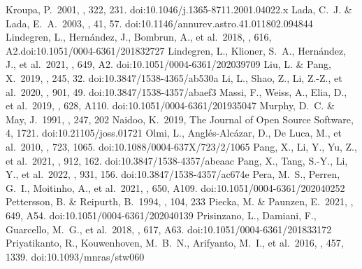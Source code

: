 \documentclass{aa} %
\begin{document}
\begin{thebibliography}{}
     Kroupa, P.\ 2001, \mnras, 322, 231. doi:10.1046/j.1365-8711.2001.04022.x
     Lada, C.~J. \& Lada, E.~A.\ 2003, \araa, 41, 57. doi:10.1146/annurev.astro.41.011802.094844
     Lindegren, L., Hern{\'a}ndez, J., Bombrun, A., et al.\ 2018, \aap, 616, A2.doi:10.1051/0004-6361/201832727
     Lindegren, L., Klioner, S.~A., Hern{\'a}ndez, J., et al.\ 2021, \aap, 649, A2. doi:10.1051/0004-6361/202039709
     Liu, L. \& Pang, X.\ 2019, \apjs, 245, 32. doi:10.3847/1538-4365/ab530a
     Li, L., Shao, Z., Li, Z.-Z., et al.\ 2020, \apj, 901, 49. doi:10.3847/1538-4357/abaef3
     Massi, F., Weiss, A., Elia, D., et al.\ 2019, \aap, 628, A110. doi:10.1051/0004-6361/201935047
     Murphy, D.~C. \& May, J.\ 1991, \aap, 247, 202        
     Naidoo, K.\ 2019, The Journal of Open Source Software, 4, 1721. doi:10.21105/joss.01721
     Olmi, L., Angl{\'e}s-Alc{\'a}zar, D., De Luca, M., et al.\ 2010, \apj, 723, 1065. doi:10.1088/0004-637X/723/2/1065
     Pang, X., Li, Y., Yu, Z., et al.\ 2021, \apj, 912, 162. doi:10.3847/1538-4357/abeaac
     Pang, X., Tang, S.-Y., Li, Y., et al.\ 2022, \apj, 931, 156. doi:10.3847/1538-4357/ac674e
     Pera, M.~S., Perren, G.~I., Moitinho, A., et al.\ 2021, \aap, 650, A109. doi:10.1051/0004-6361/202040252
     Pettersson, B. \& Reipurth, B.\ 1994, \aaps, 104, 233
     Piecka, M. \& Paunzen, E.\ 2021, \aap, 649, A54. doi:10.1051/0004-6361/202040139
     Prisinzano, L., Damiani, F., Guarcello, M.~G., et al.\ 2018, \aap, 617, A63. doi:10.1051/0004-6361/201833172
     Priyatikanto, R., Kouwenhoven, M.~B.~N., Arifyanto, M.~I., et al.\ 2016, \mnras, 457, 1339. doi:10.1093/mnras/stw060

\end{thebibliography}
\end{document}

